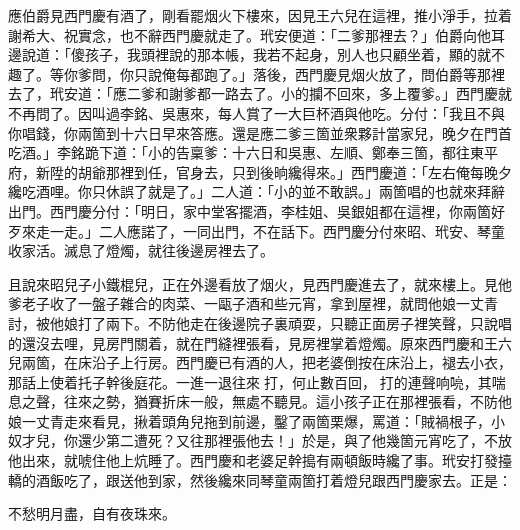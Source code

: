 應伯爵見西門慶有酒了，剛看罷烟火下樓來，因見王六兒在這裡，推小淨手，拉着謝希大、祝實念，也不辭西門慶就走了。玳安便道：「二爹那裡去？」伯爵向他耳邊說道：「傻孩子，我頭裡說的那本帳，我若不起身，別人也只顧坐着，顯的就不趣了。等你爹問，你只說俺每都跑了。」落後，西門慶見烟火放了，問伯爵等那裡去了，玳安道：「應二爹和謝爹都一路去了。小的攔不回來，多上覆爹。」西門慶就不再問了。因叫過李銘、吳惠來，每人賞了一大巨杯酒與他吃。分付：「我且不與你唱錢，你兩箇到十六日早來答應。還是應二爹三箇並衆夥計當家兒，晚夕在門首吃酒。」李銘跪下道：「小的告稟爹：十六日和吳惠、左順、鄭奉三箇，都往東平府，新陞的胡爺那裡到任，官身去，只到後晌纔得來。」西門慶道：「左右俺每晚夕纔吃酒哩。你只休誤了就是了。」二人道：「小的並不敢誤。」兩箇唱的也就來拜辭出門。西門慶分付：「明日，家中堂客擺酒，李桂姐、吳銀姐都在這裡，你兩箇好歹來走一走。」二人應諾了，一同出門，不在話下。西門慶分付來昭、玳安、琴童收家活。滅息了燈燭，就往後邊房裡去了。

且說來昭兒子小鐵棍兒，正在外邊看放了烟火，見西門慶進去了，就來樓上。見他爹老子收了一盤子雜合的肉菜、一甌子酒和些元宵，拿到屋裡，就問他娘一丈青討，被他娘打了兩下。不防他走在後邊院子裏頑耍，只聽正面房子裡笑聲，只說唱的還沒去哩，見房門關着，就在門縫裡張看，見房裡掌着燈燭。原來西門慶和王六兒兩箇，在床沿子上行房。西門慶已有酒的人，把老婆倒按在床沿上，褪去小衣，那話上使着托子幹後庭花。一進一退往來𢵞打，何止數百回，𢵞打的連聲响喨，其喘息之聲，往來之勢，猶賽折床一般，無處不聽見。這小孩子正在那裡張看，不防他娘一丈青走來看見，揪着頭角兒拖到前邊，鑿了兩箇栗爆，罵道：「賊禍根子，小奴才兒，你還少第二遭死？又往那裡張他去！」於是，與了他幾箇元宵吃了，不放他出來，就唬住他上炕睡了。西門慶和老婆足幹搗有兩頓飯時纔了事。玳安打發擡轎的酒飯吃了，跟送他到家，然後纔來同琴童兩箇打着燈兒跟西門慶家去。正是：

\begin{myquote}
不愁明月盡，自有夜珠來。
\end{myquote}

